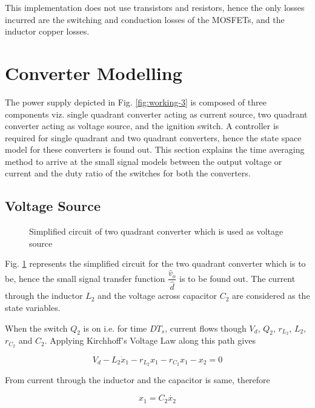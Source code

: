 \documentclass[a4paper]{IEEEtran}
\begin{document}
	This implementation does not use transistors and resistors, hence the only losses incurred are the switching and conduction losses of the MOSFETs, and the inductor copper losses.

\section{Converter Modelling}
	The power supply depicted in Fig. \ref{fig:working-3} is composed of three components viz. single quadrant converter acting as current source, two quadrant converter acting as voltage source, and the ignition switch. A controller is required for single quadrant and two quadrant converters, hence the state space model for these converters is found out. This section explains the time averaging method to arrive at the small signal models between the output voltage or current and the duty ratio of the switches for both the converters.

\subsection{Voltage Source}

	\begin{figure}
		\centering
		
		\caption{Simplified circuit of two quadrant converter which is used as voltage source}
		\label{fig:working-4}
	\end{figure}

	Fig. \ref{fig:working-4} represents the simplified circuit for the two quadrant converter which is to be, hence the small signal transfer function $\dfrac{\hat{v}_o}{\hat{d}}$ is to be found out. The current through the inductor $L_2$ and the voltage across capacitor $C_2$ are considered as the state variables.

	When the switch $Q_2$ is on i.e. for time $DT_s$, current flows though $V_d$, $Q_2$, $r_{L_2}$, $L_2$, $r_{C_2}$ and $C_2$. Applying Kirchhoff's Voltage Law along this path gives

	\begin{equation}
		V_d - L_2 \dot{x}_1 - r_{L_2}x_1 - r_{C_2}x_1-x_2 = 0
		\label{eq:mod1}
	\end{equation}

	From current through the inductor and the capacitor is same, therefore

	\begin{equation}
		x_1 = C_2\dot{x_2} 
		\label{eq:mod2}
	\end{equation}
\end{document}
